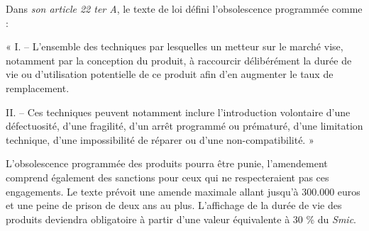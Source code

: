 \smallbreak
Dans \textit{son article 22 ter A}, le texte de loi défini l’obsolescence programmée comme :

\begin{itshape}« I. – L’ensemble des techniques par lesquelles un metteur sur le marché vise, notamment par la conception du produit, à raccourcir délibérément la durée de vie ou d’utilisation potentielle de ce produit afin d’en augmenter le taux de remplacement.

II. – Ces techniques peuvent notamment inclure l’introduction volontaire d’une défectuosité, d’une fragilité, d’un arrêt programmé ou prématuré, d’une limitation technique, d’une impossibilité de réparer ou d’une non-compatibilité. »
\end{itshape}

\smallbreak
L’obsolescence programmée des produits pourra être punie, l’amendement comprend également des sanctions pour ceux qui ne respecteraient pas ces engagements. Le texte prévoit une amende maximale allant jusqu'à 300.000 euros et une peine de prison de deux ans au plus. L'affichage de la durée de vie des produits deviendra obligatoire à partir d'une valeur équivalente à 30 \% du \textit{Smic}.
